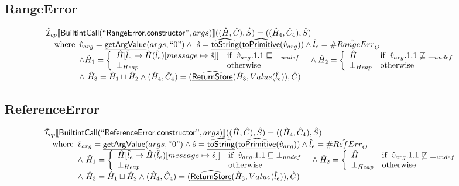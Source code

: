 \documentclass{article}
\newcommand{\SF}[1]{\mbox{\textsf{#1}}}
\newcommand{\wherec}[1]{{\rm where}\begin{array}[t]{l}#1\end{array}}
\newcommand{\ifc}[1]{{\rm if}\begin{array}[t]{l}#1\end{array}}
\newcommand{\owc}{{\rm otherwise}}
\newcommand{\aI}{\hat{\mathcal{I}}}
\newcommand{\lbr}{\llbracket}
\newcommand{\rbr}{\rrbracket}
\newcommand{\hf}[1]{\underline{\sf #1}}
\newcommand{\ahf}[1]{\widehat{\underline{\sf #1}}}
\newcommand{\avarloc}[1]{\hat{\##1}}
\begin{document}
\subsection{RangeError}
\[
\begin{array}{l}
\aI _{cp}\lbr \SF{BuiltintCall}(``\SF{RangeError.constructor}",args)\rbr((\hat{H},\hat{C}), \hat{S})
  = ((\hat{H}_4, \hat{C}_4), \hat{S})\\
\quad\wherec{
  \hat{v}_{arg} = \hf{getArgValue}(args, ``0")
  \land\ \hat{s}= \ahf{toString}(\ahf{toPrimitive}(\hat{v}_{arg}))
  \land \hat{l}_e = \avarloc{RangeErr}_O\\
  \land \hat{H}_1 = \left\{\begin{array}{ll}
      \hat{H}[\hat{l}_e \mapsto \hat{H}(\hat{l}_e)[message \mapsto \hat{s}]]
      & \ifc{\hat{v}_{arg}.1.1 \sqsubseteq \bot_{undef}}\\
      \bot_{Heap} & \owc
    \end{array}\right.
  \land \hat{H}_2 = \left\{\begin{array}{ll}
      \hat{H}
      & \ifc{\hat{v}_{arg}.1.1 \not\sqsubseteq \bot_{undef}}\\
      \bot_{Heap} & \owc
    \end{array}\right.\\
  \land\ \hat{H}_3 = \hat{H}_1 \sqcup \hat{H}_2
  \land (\hat{H}_4, \hat{C}_4) = (\ahf{ReturnStore}(\hat{H}_3, Value(\hat{l}_e)), \hat{C})\\
  }\\

\end{array}
\]


\subsection{ReferenceError}
\[
\begin{array}{l}
\aI _{cp}\lbr \SF{BuiltintCall}(``\SF{ReferenceError.constructor}",args)\rbr((\hat{H},\hat{C}), \hat{S})
  = ((\hat{H}_4, \hat{C}_4), \hat{S})\\
\quad\wherec{
  \hat{v}_{arg} = \hf{getArgValue}(args, ``0")
  \land \hat{s}= \ahf{toString}(\ahf{toPrimitive}(\hat{v}_{arg}))
  \land \hat{l}_e = \avarloc{RefErr}_O\\
  \land\ \hat{H}_1 = \left\{\begin{array}{ll}
      \hat{H}[\hat{l}_e \mapsto \hat{H}(\hat{l}_e)[message \mapsto \hat{s}]]
      & \ifc{\hat{v}_{arg}.1.1 \sqsubseteq \bot_{undef}}\\
      \bot_{Heap} & \owc
    \end{array}\right.
  \land \hat{H}_2 = \left\{\begin{array}{ll}
      \hat{H}
      & \ifc{\hat{v}_{arg}.1.1 \not\sqsubseteq \bot_{undef}}\\
      \bot_{Heap} & \owc
    \end{array}\right.\\
  \land\ \hat{H}_3 = \hat{H}_1 \sqcup \hat{H}_2
  \land (\hat{H}_4, \hat{C}_4) = (\ahf{ReturnStore}(\hat{H}_3, Value(\hat{l}_e)), \hat{C})\\
  }\\
\end{array}
\]
\end{document}
